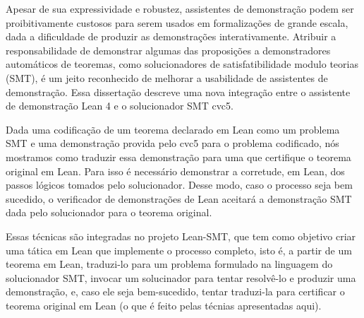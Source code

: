 Apesar de sua expressividade e robustez, assistentes
de demonstra\c{c}\~ao podem ser proibitivamente custosos
para serem usados em formaliza\c{c}\~oes de grande escala,
dada a dificuldade de produzir as demonstra\c{c}\~oes
interativamente.
%
Atribuir a responsabilidade de demonstrar algumas das
proposi\c{c}\~oes a demonstradores autom\'aticos de teoremas,
como solucionadores de satisfatibilidade modulo teorias (SMT),
\'e um jeito reconhecido de melhorar a usabilidade de
assistentes de demonstra\c{c}\~ao.
%
Essa disserta\c{c}\~ao descreve uma nova integra\c{c}\~ao
entre o assistente de demonstra\c{c}\~ao Lean 4 e o
solucionador SMT cvc5.

Dada uma codifica\c{c}\~ao de um teorema declarado em Lean como um
problema SMT e uma demonstra\c{c}\~ao provida pelo cvc5 para
o problema codificado, n\'os mostramos como traduzir essa
demonstra\c{c}\~ao para uma que certifique o teorema original em
Lean.
%
Para isso \'e necess\'ario demonstrar a corretude, em Lean, dos
passos l\'ogicos tomados pelo solucionador. Desse modo, caso o processo
seja bem sucedido, o verificador de demonstra\c{c}\~oes de Lean aceitar\'a a
demonstra\c{c}\~ao SMT dada pelo solucionador para o teorema original.

Essas t\'ecnicas s\~ao integradas no projeto Lean-SMT,
que tem como objetivo criar uma t\'atica em Lean que implemente
o processo completo, isto \'e, a partir de um teorema em Lean,
traduzi-lo para um problema formulado na linguagem do solucionador SMT,
invocar um solucinador para tentar resolv\^e-lo e produzir
uma demonstra\c{c}\~ao, e, caso ele seja bem-sucedido,
tentar traduzi-la para certificar o teorema original em Lean (o que
\'e feito pelas t\'ecnias apresentadas aqui).
